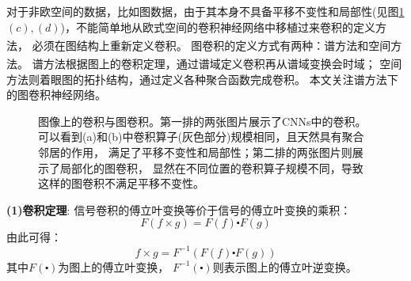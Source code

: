   对于非欧空间的数据，比如图数据，由于其本身不具备平移不变性和局部性(见图\ref{fig:compare_convs}$(c),(d)$)，不能简单地从欧式空间的卷积神经网络中移植过来卷积的定义方法，
  必须在图结构上重新定义卷积。
  图卷积的定义方式有两种：谱方法\textsuperscript{\cite{kipfGCN, SGC, ChebyNet}}和空间方法\textsuperscript{\cite{GAT,GraphSage,ConfGCN}}。
  谱方法根据图上的卷积定理，通过谱域定义卷积再从谱域变换会时域；
  空间方法则着眼图的拓扑结构，通过定义各种聚合函数完成卷积。
  本文关注谱方法下的图卷积神经网络。
  \begin{figure}[htbp]
    \centering
    \quad
    \quad
    \quad
    \caption{图像上的卷积与图卷积。第一排的两张图片展示了CNNs中的卷积。
    可以看到(a)和(b)中卷积算子(灰色部分)规模相同，且天然具有聚合邻居的作用，
    满足了平移不变性和局部性；第二排的两张图片则展示了局部化的图卷积，
    显然在不同位置的卷积算子规模不同，导致这样的图卷积不满足平移不变性。}
    \label{fig:compare_convs}
  \end{figure}

  \textbf{(1)卷积定理}:
  信号卷积的傅立叶变换等价于信号的傅立叶变换的乘积：
  \begin{equation} \label{conv_law_1}
    F(f \times g) = F(f) \centerdot F(g)
  \end{equation}
  由此可得：
  \begin{equation} \label{conv_law_2}
    f \times g = F^{-1}(F(f) \centerdot F(g))
  \end{equation}
  其中$F(\centerdot)$为图上的傅立叶变换，
  $F^{-1}(\centerdot)$则表示图上的傅立叶逆变换。


